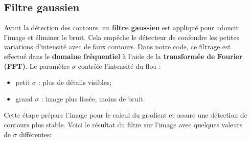 \documentclass{article}
\begin{document}
\subsection*{Filtre gaussien}
Avant la détection des contours, un \textbf{filtre gaussien} est appliqué pour adoucir l’image et éliminer le bruit.  
Cela empêche le détecteur de confondre les petites variations d’intensité avec de faux contours.  
Dans notre code, ce filtrage est effectué dans le \textbf{domaine fréquentiel} à l’aide de la \textbf{transformée de Fourier (FFT)}.  
Le paramètre \(\sigma\) contrôle l’intensité du flou :
\begin{itemize}
    \item petit \(\sigma\) : plus de détails visibles;
    \item grand \(\sigma\) : image plus lissée, moins de bruit.
\end{itemize}
Cette étape prépare l’image pour le calcul du gradient et assure une détection de contours plus stable.
Voici le résultat du filtre sur l'image avec quelques valeurs de $\sigma$ différentes:
\end{document}
